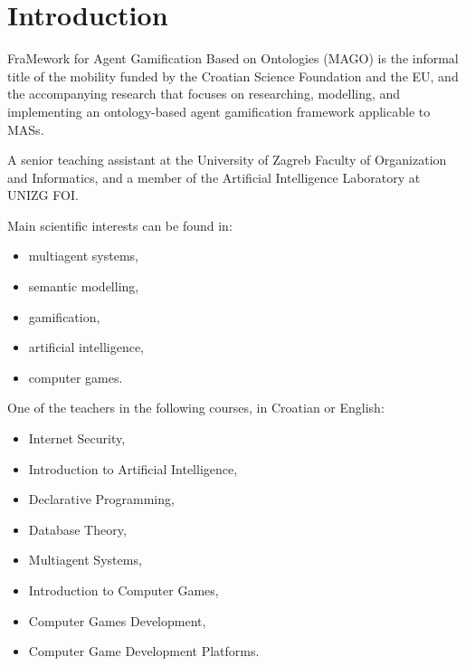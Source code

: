 \section{Introduction}

\begin{frame}{\insertsection}
    FraMework for Agent Gamification Based on Ontologies (MAGO) is the informal title of the mobility funded by the Croatian Science Foundation and the EU, and the accompanying research that focuses on researching, modelling, and implementing an \alert{ontology-based agent gamification framework} applicable to \acp{MAS}.
\end{frame}

\begin{frame}{\insertsection}
    A senior teaching assistant at the University of Zagreb \alert{Faculty of Organization and Informatics}, and a member of the Artificial Intelligence Laboratory at UNIZG FOI.
    
    Main scientific interests can be found in:
    \begin{itemize}
        \item multiagent systems,
        \item semantic modelling,
        \item gamification,
        \item artificial intelligence,
        \item computer games.
    \end{itemize}
\end{frame}

\begin{frame}{\insertsection}
    One of the teachers in the following courses, in Croatian or English:
    \begin{multicols}{2}
        \begin{itemize}
            \item Internet Security,
            \item Introduction to Artificial Intelligence,
            \item Declarative Programming,
            \item Database Theory,
            \item Multiagent Systems,
            \item Introduction to Computer Games,
            \item Computer Games Development,
            \item Computer Game Development Platforms.
        \end{itemize}
    \end{multicols}
\end{frame}


